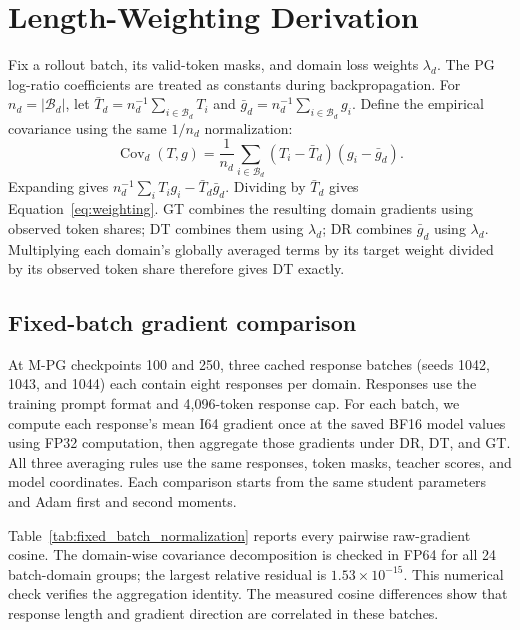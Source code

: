 \section{Length-Weighting Derivation}
\label{app:normalization}

Fix a rollout batch, its valid-token masks, and domain loss weights $\lambda_d$. The PG log-ratio coefficients are treated as constants during backpropagation. For $n_d=|\mathcal B_d|$, let $\bar T_d=n_d^{-1}\sum_{i\in\mathcal B_d}T_i$ and $\bar g_d=n_d^{-1}\sum_{i\in\mathcal B_d}g_i$. Define the empirical covariance using the same $1/n_d$ normalization:
\begin{equation}
\operatorname{Cov}_d(T,g)=\frac{1}{n_d}\sum_{i\in\mathcal B_d}(T_i-\bar T_d)(g_i-\bar g_d).
\end{equation}
Expanding gives $n_d^{-1}\sum_iT_i g_i-\bar T_d\bar g_d$. Dividing by $\bar T_d$ gives Equation~\ref{eq:weighting}. GT combines the resulting domain gradients using observed token shares; DT combines them using $\lambda_d$; DR combines $\bar g_d$ using $\lambda_d$. Multiplying each domain's globally averaged terms by its target weight divided by its observed token share therefore gives DT exactly.

\subsection{Fixed-batch gradient comparison}
\label{app:fixed_batch_normalization}

At M-PG checkpoints 100 and 250, three cached response batches (seeds 1042, 1043, and 1044) each contain eight responses per domain. Responses use the training prompt format and 4,096-token response cap. For each batch, we compute each response's mean I64 gradient once at the saved BF16 model values using FP32 computation, then aggregate those gradients under DR, DT, and GT. All three averaging rules use the same responses, token masks, teacher scores, and model coordinates. Each comparison starts from the same student parameters and Adam first and second moments.

Table~\ref{tab:fixed_batch_normalization} reports every pairwise raw-gradient cosine. The domain-wise covariance decomposition is checked in FP64 for all 24 batch-domain groups; the largest relative residual is $1.53\times10^{-15}$. This numerical check verifies the aggregation identity. The measured cosine differences show that response length and gradient direction are correlated in these batches.

